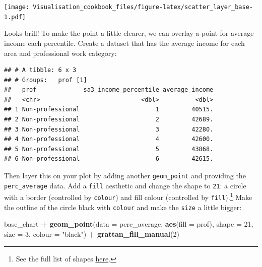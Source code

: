 \documentclass[]{book}
\newenvironment{Shaded}{\begin{snugshade}}{\end{snugshade}}
\newcommand{\DataTypeTok}[1]{\textcolor[rgb]{0.13,0.29,0.53}{#1}}
\newcommand{\DecValTok}[1]{\textcolor[rgb]{0.00,0.00,0.81}{#1}}
\newcommand{\KeywordTok}[1]{\textcolor[rgb]{0.13,0.29,0.53}{\textbf{#1}}}
\newcommand{\NormalTok}[1]{#1}
\newcommand{\OperatorTok}[1]{\textcolor[rgb]{0.81,0.36,0.00}{\textbf{#1}}}
\newcommand{\StringTok}[1]{\textcolor[rgb]{0.31,0.60,0.02}{#1}}
\let\rmarkdownfootnote\footnote%
\def\footnote{\protect\rmarkdownfootnote}
\begin{document}
\texttt{[image: Visualisation\_cookbook\_files/figure-latex/scatter\_layer\_base-1.pdf]}

Looks brill! To make the point a little clearer, we can overlay a point for average income each percentile. Create a dataset that has the average income for each area and professional work category:

\begin{Shaded}
\end{Shaded}

\begin{verbatim}
## # A tibble: 6 x 3
## # Groups:   prof [1]
##   prof             sa3_income_percentile average_income
##   <chr>                            <dbl>          <dbl>
## 1 Non-professional                     1         40515.
## 2 Non-professional                     2         42689.
## 3 Non-professional                     3         42280.
## 4 Non-professional                     4         42600.
## 5 Non-professional                     5         43868.
## 6 Non-professional                     6         42615.
\end{verbatim}

Then layer this on your plot by adding another \texttt{geom\_point} and providing the \texttt{perc\_average} data. Add a \texttt{fill} aesthetic and change the shape to \texttt{21}: a circle with a border (controlled by \texttt{colour}) and fill colour (controlled by \texttt{fill}).\footnote{See the full list of shapes \href{https://ggplot2.tidyverse.org/reference/scale_shape.html}{here}.}
Make the outline of the circle black with \texttt{colour} and make the \texttt{size} a little bigger:

\begin{Shaded}
\begin{Highlighting}[]
\NormalTok{base_chart }\OperatorTok{+}
\StringTok{  }\KeywordTok{geom_point}\NormalTok{(}\DataTypeTok{data =}\NormalTok{ perc_average,}
             \KeywordTok{aes}\NormalTok{(}\DataTypeTok{fill =}\NormalTok{ prof),}
             \DataTypeTok{shape =} \DecValTok{21}\NormalTok{,}
             \DataTypeTok{size =} \DecValTok{3}\NormalTok{, }
             \DataTypeTok{colour =} \StringTok{"black"}\NormalTok{) }\OperatorTok{+}\StringTok{ }
\StringTok{  }\KeywordTok{grattan_fill_manual}\NormalTok{(}\DecValTok{2}\NormalTok{)}
\end{Highlighting}
\end{Shaded}
\end{document}
